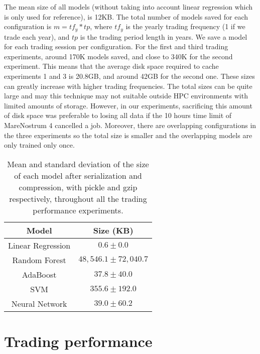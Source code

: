 The mean size of all models (without taking into account linear regression which is only used for reference), is 12KB. The total number of models saved for each configuration is $m=tf_y * tp$, where $tf_y$ is the yearly trading frequency (1 if we trade each year), and $tp$ is the trading period length in years. We save a model for each trading session per configuration. For the first and third trading experiments, around 170K models saved, and close to 340K for the second experiment. This means that the average disk space required to cache experiments 1 and 3 is 20.8GB, and around 42GB for the second one. These sizes can greatly increase with higher trading frequencies. The total sizes can be quite large and may this technique may not suitable outside HPC environments with limited amounts of storage. However, in our experiments, sacrificing this amount of disk space was preferable to losing all data if the 10 hours time limit of MareNostrum 4 cancelled a job. Moreover, there are overlapping configurations in the three experiments so the total size is smaller and the overlapping models are only trained only once.

\begin{table}
\centering
    \begin{tabular}{|c|c|}
    \hline
    Model                        & Size (KB) \\ \hline
    Linear Regression            & $0.6 \pm 0.0 $     \\
    Random Forest                & $48,546.1 \pm 72,040.7 $   \\
    AdaBoost                     & $37.8 \pm 40.0$  \\
    SVM                          & $355.6 \pm 192.0 $   \\
    Neural Network               & $39.0 \pm 60.2$ \\ \hline
    \end{tabular}
    \caption{Mean and standard deviation of the size of each model after serialization and compression, with pickle and gzip respectively, throughout all the trading performance experiments.}
    \label{tab:sizes}
\end{table}

\section{Trading performance}
\label{sec:trading_performance}

